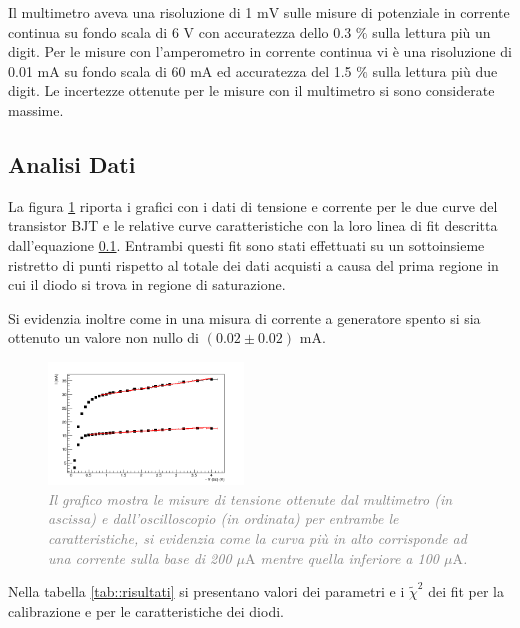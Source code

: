 \documentclass[a4paper,11pt]{article}
\begin{document}
Il multimetro aveva una risoluzione di 1 $\mathrm{mV}$ sulle misure di potenziale in corrente continua su fondo scala di 6 $\mathrm{V}$ con accuratezza dello 0.3 $\%$ sulla lettura più un digit. Per le misure con l'amperometro in corrente continua vi è una risoluzione di 0.01 $\mathrm{mA}$ su fondo scala di 60 $\mathrm{mA}$ ed accuratezza del 1.5 $\%$ sulla lettura più due digit. Le incertezze ottenute per le misure con il multimetro si sono considerate massime.

\subsection{Analisi Dati} 

La figura \ref{graph::i_tot} riporta i grafici con i dati di tensione e corrente per le due curve del transistor BJT e le relative curve caratteristiche con la loro linea di fit descritta dall'equazione \ref{}. Entrambi questi fit sono stati effettuati su un sottoinsieme ristretto di punti rispetto al totale dei dati acquisti a causa del prima regione in cui il diodo si trova in regione di saturazione.

Si evidenzia inoltre come in una misura di corrente a generatore spento si sia ottenuto un valore non nullo di $(0.02 \pm 0.02)$ $\mathrm{mA}$. %

\begin{figure}[H]
    \centering
    \includegraphics[width=0.4624\textwidth]{pictures/tot.png}
    \caption{\textit{\textcolor{gray}{Il grafico mostra le misure di tensione ottenute dal multimetro (in ascissa) e dall'oscilloscopio (in ordinata) per entrambe le caratteristiche, si evidenzia come la curva più in alto corrisponde ad una corrente sulla base di 200 $\mu\mathrm{A}$ mentre quella inferiore a 100 $\mu\mathrm{A}$.}}}
    \label{graph::i_tot}
\end{figure}


Nella tabella \ref{tab::risultati} si presentano valori dei parametri e i $\tilde\chi^2$ dei fit per la calibrazione e per le caratteristiche dei diodi.
\end{document}
